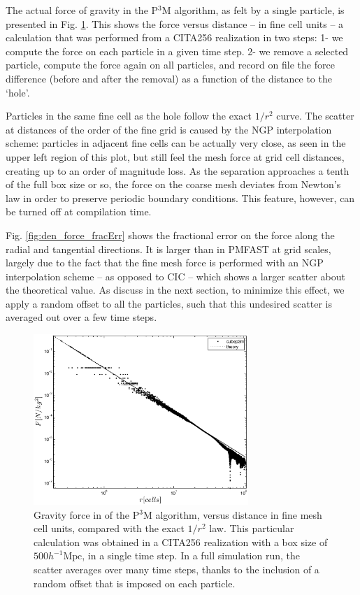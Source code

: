 The actual force of gravity in the P$^3$M algorithm,
as felt by a single particle, is presented in Fig. \ref{fig:den_force_ppext0}.
This shows the force versus distance -- in fine cell units -- a calculation that was performed from a CITA256 realization in two steps: 
1- we compute the force on each particle in a given time step.
2- we remove a selected particle, compute the force again on all particles, and record on file the 
force difference (before  and after the removal) as a function of the distance to the `hole'.

Particles in the same fine cell as the hole follow the exact $1/r^{2}$ curve. The scatter at 
  distances of the order of the fine grid is caused by the NGP interpolation scheme:
  particles in adjacent fine cells can be actually very close, as seen in the upper left region of this plot,
  but still feel the mesh force at grid cell distances,
  creating up to an order of magnitude loss.
As the separation approaches a tenth of the full box size or so, the force on the coarse mesh deviates
from Newton's law in order to preserve periodic boundary conditions. 
This feature, however, can be turned off at compilation time.


Fig. \ref{fig:den_force_fracErr} shows the fractional error on the force along the radial and tangential directions.
It is larger than in {\small PMFAST} at grid scales, largely due to the fact that the fine mesh force is performed with an NGP interpolation scheme -- as opposed to CIC -- which shows a larger scatter about the theoretical value. 
As discuss in the next section, to minimize this effect, we apply a random offset to all the particles,
such that this undesired scatter is averaged out over a few time steps.



\begin{figure}%
  \begin{center}
    \includegraphics[width=3.2in]{graphs/densityForce_ppext=0.eps}
  \caption{Gravity force in of the P$^3$M algorithm, versus distance in fine mesh cell units, compared with the exact $1/r^{2}$ law.
    This particular calculation was obtained in a CITA256 realization with  a box size of $500 h^{-1}\mbox{Mpc}$,
    in a single time step. In a full simulation run, the scatter averages over many time steps, thanks to the inclusion of a random offset that is imposed on each particle. 
    \label{fig:den_force_ppext0}}
\end{center}
\end{figure}

